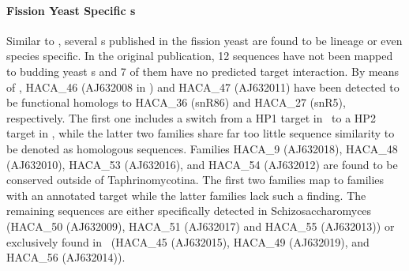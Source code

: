 \paragraph{\textbf{Fission Yeast Specific \sno s}}

%
%
%
Similar to \calb, several \sno s published in the fission
yeast \cite{Li:2005} are found to be lineage or even species
specific. In the original publication, 12 sequences have not been mapped to budding yeast \sno s and 7 of them have no predicted target interaction. By means of \snostrip, HACA\_46 (AJ632008 in \cite{Li:2005}) and HACA\_47 (AJ632011) have been detected to be functional homologs to HACA\_36 (snR86) and HACA\_27 (snR5), respectively. The first one includes a switch from a HP1 target in \spo\ to a HP2 target in \sce, while the latter two families share far too little sequence similarity to be denoted as homologous sequences. Families HACA\_9 (AJ632018), HACA\_48 (AJ632010), HACA\_53 (AJ632016), and HACA\_54 (AJ632012) are found to be conserved outside of Taphrinomycotina. The first two families map to families with an annotated target while the latter families lack such a finding. The remaining sequences are either specifically detected in Schizosaccharomyces (HACA\_50 (AJ632009), HACA\_51 (AJ632017) and HACA\_55 (AJ632013)) or exclusively found in \spo\ (HACA\_45 (AJ632015), HACA\_49 (AJ632019), and HACA\_56 (AJ632014)).


